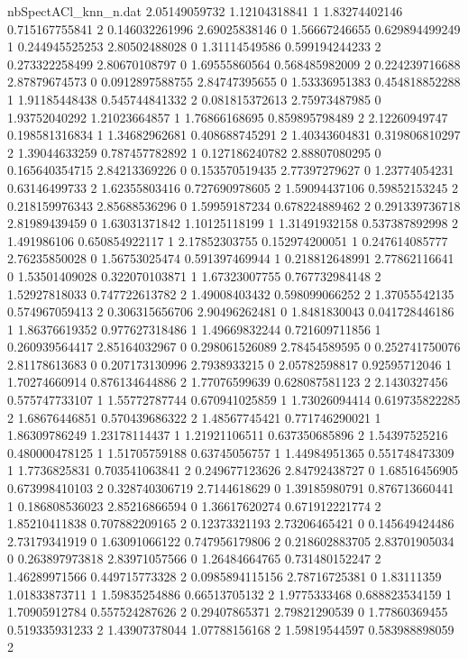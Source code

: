 \begin{filecontents}{nbSpectACl_knn_n.dat}
2.05149059732 1.12104318841 1
1.83274402146 0.715167755841 2
0.146032261996 2.69025838146 0
1.56667246655 0.629894499249 1
0.244945525253 2.80502488028 0
1.31114549586 0.599194244233 2
0.273322258499 2.80670108797 0
1.69555860564 0.568485982009 2
0.224239716688 2.87879674573 0
0.0912897588755 2.84747395655 0
1.53336951383 0.454818852288 1
1.91185448438 0.545744841332 2
0.081815372613 2.75973487985 0
1.93752040292 1.21023664857 1
1.76866168695 0.859895798489 2
2.12260949747 0.198581316834 1
1.34682962681 0.408688745291 2
1.40343604831 0.319806810297 2
1.39044633259 0.787457782892 1
0.127186240782 2.88807080295 0
0.165640354715 2.84213369226 0
0.153570519435 2.77397279627 0
1.23774054231 0.63146499733 2
1.62355803416 0.727690978605 2
1.59094437106 0.59852153245 2
0.218159976343 2.85688536296 0
1.59959187234 0.678224889462 2
0.291339736718 2.81989439459 0
1.63031371842 1.10125118199 1
1.31491932158 0.537387892998 2
1.491986106 0.650854922117 1
2.17852303755 0.152974200051 1
0.247614085777 2.76235850028 0
1.56753025474 0.591397469944 1
0.218812648991 2.77862116641 0
1.53501409028 0.322070103871 1
1.67323007755 0.767732984148 2
1.52927818033 0.747722613782 2
1.49008403432 0.598099066252 2
1.37055542135 0.574967059413 2
0.306315656706 2.90496262481 0
1.8481830043 0.041728446186 1
1.86376619352 0.977627318486 1
1.49669832244 0.721609711856 1
0.260939564417 2.85164032967 0
0.298061526089 2.78454589595 0
0.252741750076 2.81178613683 0
0.207173130996 2.7938933215 0
2.05782598817 0.92595712046 1
1.70274660914 0.876134644886 2
1.77076599639 0.628087581123 2
2.1430327456 0.575747733107 1
1.55772787744 0.670941025859 1
1.73026094414 0.619735822285 2
1.68676446851 0.570439686322 2
1.48567745421 0.771746290021 1
1.86309786249 1.23178114437 1
1.21921106511 0.637350685896 2
1.54397525216 0.480000478125 1
1.51705759188 0.63745056757 1
1.44984951365 0.551748473309 1
1.7736825831 0.703541063841 2
0.249677123626 2.84792438727 0
1.68516456905 0.673998410103 2
0.328740306719 2.7144618629 0
1.39185980791 0.876713660441 1
0.186808536023 2.85216866594 0
1.36617620274 0.671912221774 2
1.85210411838 0.707882209165 2
0.12373321193 2.73206465421 0
0.145649424486 2.73179341919 0
1.63091066122 0.747956179806 2
0.218602883705 2.83701905034 0
0.263897973818 2.83971057566 0
1.26484664765 0.731480152247 2
1.46289971566 0.449715773328 2
0.0985894115156 2.78716725381 0
1.83111359 1.01833873711 1
1.59835254886 0.66513705132 2
1.9775333468 0.688823534159 1
1.70905912784 0.557524287626 2
0.29407865371 2.79821290539 0
1.77860369455 0.519335931233 2
1.43907378044 1.07788156168 2
1.59819544597 0.583988898059 2

\end{filecontents}
